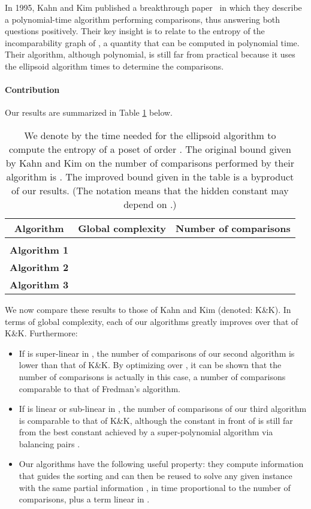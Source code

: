 \documentclass{article} \usepackage{fullpage}
\begin{document}
In 1995, Kahn and Kim published a breakthrough paper~\cite{KK95} in which they describe a polynomial-time algorithm performing  comparisons, thus answering both questions positively. Their key insight is to relate  to the entropy of the incomparability graph of , a quantity that can be computed in polynomial time. Their algorithm, although polynomial, is still far from practical because it uses the ellipsoid algorithm  times to determine the comparisons.

\paragraph*{Contribution}

Our results are summarized in Table \ref{tab:results} below. 

\begin{table}[h!]
\begin{center}
\begin{tabular}{|c|c|c|}
\hline
Algorithm & Global complexity & Number of comparisons\\
\hline
\hline
\cite{KK95} & & \\
\hline
\hline
{\bf Algorithm 1} &  & \\
\hline
{\bf Algorithm 2} &  & \\
\hline
{\bf Algorithm 3} &  & \\
\hline
\end{tabular}
\end{center}
\label{tab:results}
\caption{We denote by  the time needed for the ellipsoid algorithm to compute the entropy of a poset of order . The original bound given by Kahn and Kim on the number of comparisons performed by their algorithm is . The improved bound given in the table is a byproduct of our results. (The notation  means that the hidden constant may depend on .)
}
\end{table}

We now compare these results to those of Kahn and Kim (denoted: K\&K). In terms of global complexity, each of our algorithms greatly improves over that of K\&K. Furthermore:

\begin{itemize}
\item If  is super-linear in , the number of comparisons of our second algorithm is lower than that of K\&K. By optimizing over , it can be shown that the number of comparisons is actually  in this case, a number of comparisons comparable to that of Fredman's algorithm. 

\item If  is linear or sub-linear in , the number of comparisons of our third algorithm is comparable to that of K\&K, although the constant in front of  is still far from the best constant achieved by a super-polynomial algorithm via balancing pairs \cite{BFT95,B99}.

\item Our algorithms have the following useful property: they compute information that guides the sorting and can then be reused to solve any given instance with the same partial information , in time proportional to the number of comparisons, plus a term linear in .
\end{itemize}
\end{document}
